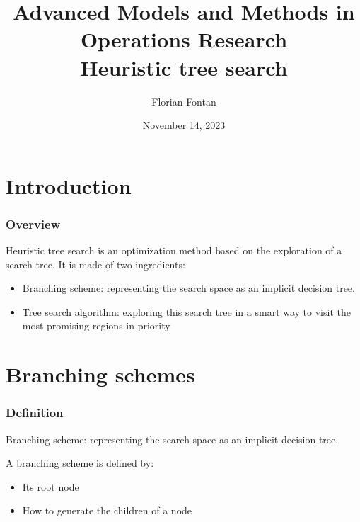 \documentclass[10pt]{beamer}
\author{Florian Fontan}
\title{Advanced Models and Methods in Operations Research \\ Heuristic tree search}
\date{November 14, 2023}
\begin{document}
\newcommand{\customcite}[1]{\citetitle{#1}, \citeauthor{#1}, \citeyear{#1}}


\maketitle

\section{Introduction}

\begin{frame}
  \frametitle{Overview}

  Heuristic tree search is an optimization method based on the exploration of a search tree. It is made of two ingredients: \pause
  \begin{itemize}
    \item Branching scheme: representing the search space as an implicit decision tree. \pause
    \item Tree search algorithm: exploring this search tree in a smart way to visit the most promising regions in priority
  \end{itemize}
\end{frame}

\section{Branching schemes}

\begin{frame}
  \frametitle{Definition}

  Branching scheme: representing the search space as an implicit decision tree.

  \bigskip

  A branching scheme is defined by:
  \begin{itemize}
    \item Its root node
    \item How to generate the children of a node
  \end{itemize}
\end{frame}
\end{document}
